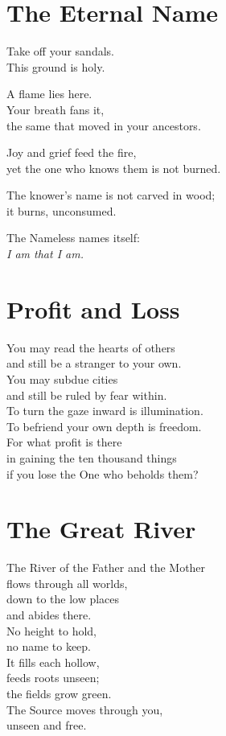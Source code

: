 \documentclass[10pt, openright]{book}
\newcommand{\sectionbreak}{\filbreak}
\newcommand{\sayingsource}[1]{\par\nopagebreak\vspace{0.3\baselineskip}{\raggedleft\footnotesize\itshape #1\par}}
\begin{document}
\sectionbreak

\section{The Eternal Name}\label{the-eternal-name}

Take off your sandals.\\
This ground is holy.

A flame lies here.\\
Your breath fans it,\\
the same that moved in your ancestors.

Joy and grief feed the fire,\\
yet the one who knows them is not burned.

The knower's name is not carved in wood;\\
it burns, unconsumed.

The Nameless names itself:\\
\emph{I am that I am.}

\sayingsource{Exodus 3:2--6, 3:14 · John 8:58 · Thunder, Perfect Mind ·
Tao Te Ching 1 · Genesis 1:2}

\sectionbreak

\section{Profit and Loss}\label{profit-and-loss}

You may read the hearts of others\\
and still be a stranger to your own.\\
You may subdue cities\\
and still be ruled by fear within.\\
To turn the gaze inward is illumination.\\
To befriend your own depth is freedom.\\
For what profit is there\\
in gaining the ten thousand things\\
if you lose the One who beholds them?

\sayingsource{Tao Te Ching 33 · Mark 8:36}

\sectionbreak

\section{The Great River}\label{the-great-river}

The River of the Father and the Mother\\
flows through all worlds,\\
down to the low places\\
and abides there.\\
No height to hold,\\
no name to keep.\\
It fills each hollow,\\
feeds roots unseen;\\
the fields grow green.\\
The Source moves through you,\\
unseen and free.
\end{document}
